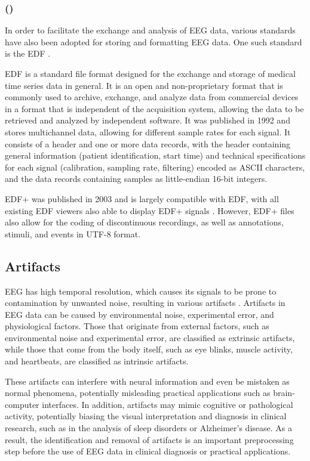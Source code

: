 \subsubsection{ ()}
In order to facilitate the exchange and analysis of EEG data, various standards have also been adopted for storing and formatting EEG data. One such standard is the \gls{EDF} \cite{kemp_simple_1992}.

\gls{EDF} is a standard file format designed for the exchange and storage of medical time series data in general. 
It is an open and non-proprietary format that is commonly used to archive, exchange, and analyze data from commercial devices in a format that is independent of the acquisition system, allowing the data to be retrieved and analyzed by independent software. 
It was published in 1992 and stores multichannel data, allowing for different sample rates for each signal. It consists of a header and one or more data records, with the header containing general information (patient identification, start time) and technical specifications for each signal (calibration, sampling rate, filtering) encoded as ASCII characters, and the data records containing samples as little-endian 16-bit integers. 

\gls{EDF+} was published in 2003 and is largely compatible with \gls{EDF}, with all existing \gls{EDF} viewers also able to display \gls{EDF+} signals \cite{kemp_european_2003}. However, \gls{EDF+} files also allow for the coding of discontinuous recordings, as well as annotations, stimuli, and events in UTF-8 format.

\subsection{Artifacts}
\gls{EEG} has high temporal resolution, which causes its signals to be prone to contamination by unwanted noise, resulting in various artifacts \cite{jiang_removal_2019, raduntz_automated_2017}. 
Artifacts in \gls{EEG} data can be caused by environmental noise, experimental error, and physiological factors. Those that originate from external factors, such as environmental noise and experimental error, are classified as extrinsic artifacts, while those that come from the body itself, such as eye blinks, muscle activity, and heartbeats, are classified as intrinsic artifacts. 

These artifacts can interfere with neural information and even be mistaken as normal phenomena, potentially misleading practical applications such as brain-computer interfaces. In addition, artifacts may mimic cognitive or pathological activity, potentially biasing the visual interpretation and diagnosis in clinical research, such as in the analysis of sleep disorders or Alzheimer's disease. As a result, the identification and removal of artifacts is an important preprocessing step before the use of \gls{EEG} data in clinical diagnosis or practical applications.

